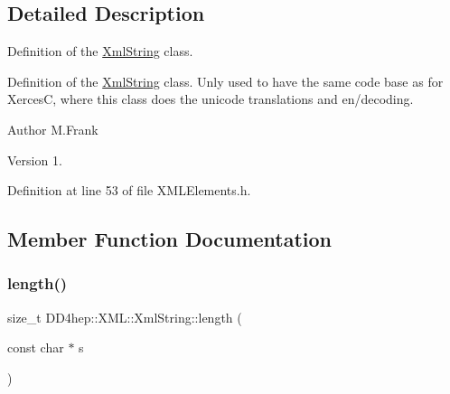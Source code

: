 

\subsection{Detailed Description}
Definition of the \hyperlink{class_d_d4hep_1_1_x_m_l_1_1_xml_string}{Xml\+String} class. 

Definition of the \hyperlink{class_d_d4hep_1_1_x_m_l_1_1_xml_string}{Xml\+String} class. Unly used to have the same code base as for XercesC, where this class does the unicode translations and en/decoding.

\begin{DoxyAuthor}{Author}
M.\+Frank 
\end{DoxyAuthor}
\begin{DoxyVersion}{Version}
1. 
\end{DoxyVersion}


Definition at line 53 of file X\+M\+L\+Elements.\+h.



\subsection{Member Function Documentation}
\hypertarget{class_d_d4hep_1_1_x_m_l_1_1_xml_string_aa4237a8d0f89aa98c8322ca4893c2b74}{}\label{class_d_d4hep_1_1_x_m_l_1_1_xml_string_aa4237a8d0f89aa98c8322ca4893c2b74} 
\subsubsection{\texorpdfstring{length()}{length()}\hspace{0.1cm}{\footnotesize\ttfamily [1/2]}}
{\footnotesize\ttfamily size\+\_\+t D\+D4hep\+::\+X\+M\+L\+::\+Xml\+String\+::length (\begin{DoxyParamCaption}\item[{const char $\ast$}]{s }\end{DoxyParamCaption})\hspace{0.3cm}{\ttfamily [static]}}



